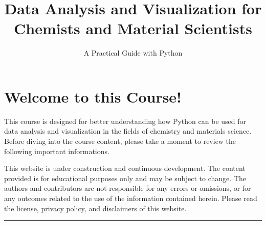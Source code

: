 \documentclass[
  letterpaper,
  DIV=11,
  numbers=noendperiod]{scrreprt}
\title{Data Analysis and Visualization for Chemists and Material
Scientists}
\subtitle{A Practical Guide with Python}
\author{}
\date{}
\renewcommand*\contentsname{Table of contents}
\newcommand\contentsname{Table of contents}
\begin{document}
\maketitle

\renewcommand*\contentsname{Table of contents}
{
\hypersetup{linkcolor=}
\setcounter{tocdepth}{2}
\tableofcontents
}


\chapter{Welcome to this Course!}\label{welcome-to-this-course}

This course is designed for better understanding how Python can be used
for data analysis and visualization in the fields of chemistry and
materials science. Before diving into the course content, please take a
moment to review the following important informations.

\begin{tcolorbox}[enhanced jigsaw, leftrule=.75mm, bottomrule=.15mm, colbacktitle=quarto-callout-caution-color!10!white, title=\textcolor{quarto-callout-caution-color}{\faFire}\hspace{0.5em}{Disclaimer}, breakable, arc=.35mm, toptitle=1mm, opacityback=0, titlerule=0mm, coltitle=black, colback=white, opacitybacktitle=0.6, colframe=quarto-callout-caution-color-frame, left=2mm, rightrule=.15mm, toprule=.15mm, bottomtitle=1mm]

This website is under construction and continuous development. The
content provided is for educational purposes only and may be subject to
change. The authors and contributors are not responsible for any errors
or omissions, or for any outcomes related to the use of the information
contained herein. Please read the
\href{informations/license.qmd}{license},
\href{informations/privacy.qmd}{privacy policy}, and
\href{informations/disclaimer.qmd}{disclaimers} of this website.

\end{tcolorbox}

\begin{center}\rule{0.5\linewidth}{0.5pt}\end{center}
\end{document}
